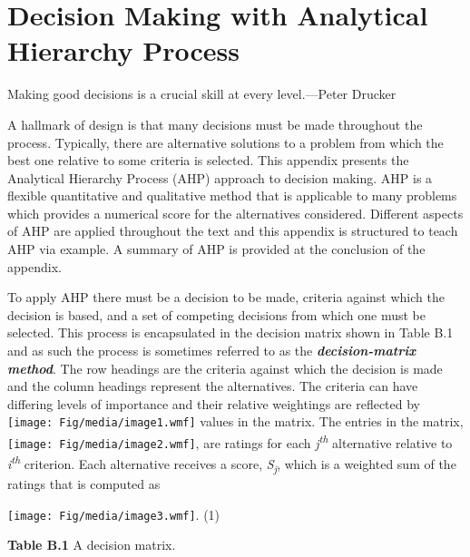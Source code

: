 \section{\texorpdfstring{Decision Making with Analytical Hierarchy
Process
}{Decision Making with Analytical Hierarchy Process }}\label{decision-making-with-analytical-hierarchy-process}

Making good decisions is a crucial skill at every level.---Peter Drucker

A hallmark of design is that many decisions must be made throughout the
process. Typically, there are alternative solutions to a problem from
which the best one relative to some criteria is selected. This appendix
presents the Analytical Hierarchy Process (AHP) approach to decision
making. AHP is a flexible quantitative and qualitative method that is
applicable to many problems which provides a numerical score for the
alternatives considered. Different aspects of AHP are applied throughout
the text and this appendix is structured to teach AHP via example. A
summary of AHP is provided at the conclusion of the appendix.

To apply AHP there must be a decision to be made, criteria against which
the decision is based, and a set of competing decisions from which one
must be selected. This process is encapsulated in the decision matrix
shown in Table B.1 and as such the process is sometimes referred to as
the \emph{\textbf{decision-matrix method}}. The row headings are the
criteria against which the decision is made and the column headings
represent the alternatives. The criteria can have differing levels of
importance and their relative weightings are reflected by
\texttt{[image: Fig/media/image1.wmf]} values in the matrix. The entries
in the matrix, \texttt{[image: Fig/media/image2.wmf]}, are ratings for
each \emph{j\textsuperscript{th}} alternative relative to
\emph{i\textsuperscript{th}} criterion. Each alternative receives a
score, \emph{S\textsubscript{j}}, which is a weighted sum of the ratings
that is computed as

\texttt{[image: Fig/media/image3.wmf]}. (1)

\textbf{Table B.1} A decision matrix.

